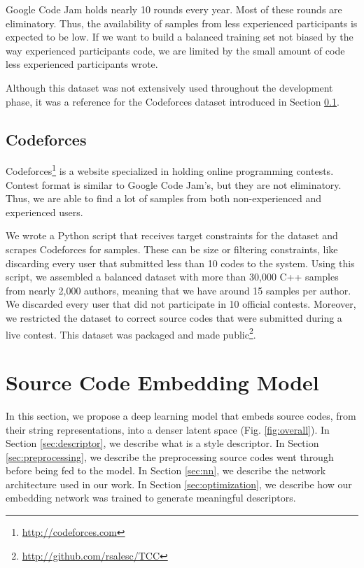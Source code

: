 Google Code Jam holds nearly 10 rounds every year. Most of these rounds are eliminatory. Thus, the availability of samples from less experienced participants is expected to be low. If we want to build a balanced training set not biased by the way experienced participants code, we are limited by the small amount of code less experienced participants wrote.

Although this dataset was not extensively used throughout the development phase, it was a reference for the Codeforces dataset introduced in Section \ref{sec:codeforces}.

\subsection{Codeforces}\label{sec:codeforces}

Codeforces\footnote{\url{http://codeforces.com}} is a website specialized in holding online programming contests. Contest format is similar to Google Code Jam's, but they are not eliminatory. Thus, we are able to find a lot of samples from both non-experienced and experienced users.

We wrote a Python script that receives target constraints for the dataset and scrapes Codeforces for samples.  These can be size or filtering constraints, like discarding every user that submitted less than 10 codes to the system.
Using this script, we assembled a balanced dataset with more than 30,000 C++ samples from nearly 2,000 authors, meaning that we have around 15 samples per author.  We discarded every user that did not participate in 10 official contests. Moreover, we restricted the dataset to correct source codes that were submitted during a live contest. This dataset was packaged and made public\footnote{\url{http://github.com/rsalesc/TCC}}.

\section{Source Code Embedding Model}\label{sec:framework}

In this section, we propose a deep learning model that embeds source codes, from their string representations, into a denser latent space (Fig. \ref{fig:overall}). In Section \ref{sec:descriptor}, we describe what is a style descriptor. In Section \ref{sec:preprocessing}, we describe the preprocessing source codes went through before being fed to the model. In Section \ref{sec:nn}, we describe the network architecture used in our work. In Section \ref{sec:optimization}, we describe how our embedding network was trained to generate meaningful descriptors.

